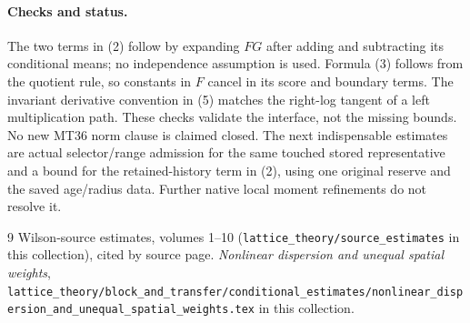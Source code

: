 \documentclass[11pt]{article}
\begin{document}
\paragraph{Checks and status.}
The two terms in (2) follow by expanding $FG$ after adding and subtracting its
conditional means; no independence assumption is used. Formula (3) follows from
the quotient rule, so constants in $F$ cancel in its score and boundary terms.
The invariant derivative convention in (5) matches the right-log tangent of a
left multiplication path. These checks validate the interface, not the missing
bounds. No new MT36 norm clause is claimed closed. The next indispensable estimates are
actual selector/range admission for the same touched stored representative and a
bound for the retained-history term in (2), using one original reserve and the
saved age/radius data. Further native local moment refinements do not resolve it.
\begin{thebibliography}{9}
 Wilson-source estimates, volumes 1--10 (\texttt{lattice\_theory/source\_estimates} in this collection), cited by source page.
 \emph{Nonlinear dispersion and unequal spatial weights}, \texttt{lattice\_theory/block\_and\_transfer/conditional\_estimates/nonlinear\_dispersion\_and\_unequal\_spatial\_weights.tex} in this collection.
\end{thebibliography}
\end{document}
